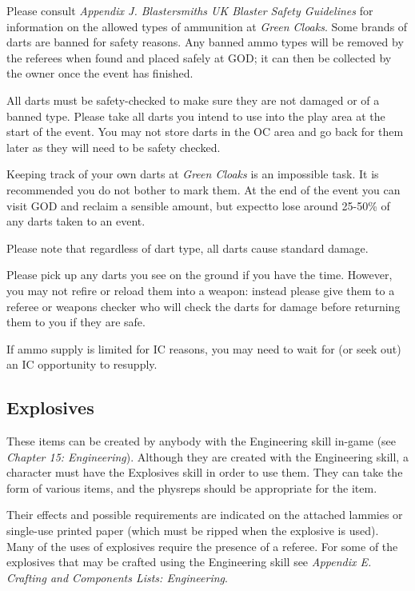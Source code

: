 Please consult \textit{Appendix J. Blastersmiths UK Blaster Safety Guidelines} for information on the allowed types of ammunition at \textit{Green Cloaks}. Some brands of darts are banned for safety reasons. Any banned ammo types will be removed by the referees when found and placed safely at GOD; it can then be collected by the owner once the event has finished.

All darts must be safety-checked to make sure they are not damaged or of a banned type. Please take all darts you intend to use into the play area at the start of the event. You may not store darts in the OC area and go back for them later as they will need to be safety checked.

Keeping track of your own darts at \textit{Green Cloaks} is an impossible task. It is recommended you do not bother to mark them. At the end of the event you can visit GOD and reclaim a sensible amount, but expectto lose around 25-50\% of any darts taken to an event.

Please note that regardless of dart type, all darts cause standard damage.

Please pick up any darts you see on the ground if you have the time. However, you may not refire or reload them into a weapon: instead please give them to a referee or weapons checker who will check the darts for damage before returning them to you if they are safe.

If ammo supply is limited for IC reasons, you may need to wait for (or seek out) an IC opportunity to resupply.

\subsection{Explosives}

These items can be created by anybody with the Engineering skill in-game (see \textit{Chapter 15: Engineering}). Although they are created with the Engineering skill, a character must have the Explosives skill in order to use them. They can take the form of various items, and the physreps should be appropriate for the item.

Their effects and possible requirements are indicated on the attached lammies or single-use printed paper (which must be ripped when the explosive is used). Many of the uses of explosives require the presence of a referee. For some of the explosives that may be crafted using the Engineering skill see \textit{Appendix E.} \textit{Crafting and Components Lists: Engineering}.

